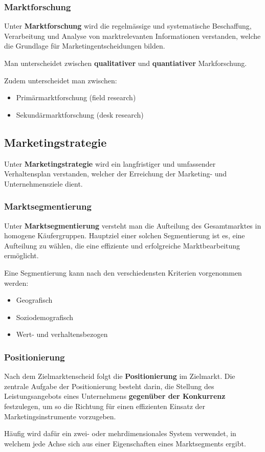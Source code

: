 \documentclass[12pt]{article}
\begin{document}
\subsubsection{Marktforschung}
\begin{Definitionsbox}
    Unter \textbf{Marktforschung} wird die regelmässige und systematische Beschaffung, Verarbeitung und Analyse von marktrelevanten Informationen verstanden, welche die Grundlage für Marketingentscheidungen bilden.
\end{Definitionsbox}
Man unterscheidet zwischen \textbf{qualitativer} und \textbf{quantiativer} Markforschung.

Zudem unterscheidet man zwischen:
\begin{itemize}
    \item Primärmarktforschung (field research)
    \item Sekundärmarktforschung (desk research)
\end{itemize}

\subsection{Marketingstrategie}
\begin{Definitionsbox}
    Unter \textbf{Marketingstrategie} wird ein langfristiger und umfassender Verhaltensplan verstanden, welcher der Erreichung der Marketing- und Unternehmensziele dient.
\end{Definitionsbox}

\subsubsection{Marktsegmentierung}
\begin{Definitionsbox}
    Unter \textbf{Marktsegmentierung} versteht man die Aufteilung des Gesamtmarktes in homogene Käufergruppen. Hauptziel einer solchen Segmentierung ist es, eine Aufteilung zu wählen, die eine effiziente und erfolgreiche Marktbearbeitung ermöglicht.
\end{Definitionsbox}
Eine Segmentierung kann nach den verschiedensten Kriterien vorgenommen werden:
\begin{itemize}
    \item Geografisch
    \item Soziodemografisch
    \item Wert- und verhaltensbezogen
\end{itemize}

\subsubsection{Positionierung}
\begin{Definitionsbox}
    Nach dem Zielmarktenscheid folgt die \textbf{Positionierung} im Zielmarkt. Die zentrale Aufgabe der Positionierung besteht darin, die Stellung des Leistungsangebots eines Unternehmens \textbf{gegenüber der Konkurrenz} festzulegen, um so die Richtung für einen effizienten Einsatz der Marketingsinstrumente vorzugeben.
\end{Definitionsbox}
Häufig wird dafür ein zwei- oder mehrdimensionales System verwendet, in welchem jede Achse sich aus einer Eigenschaften eines Marktsegments ergibt.
\end{document}
